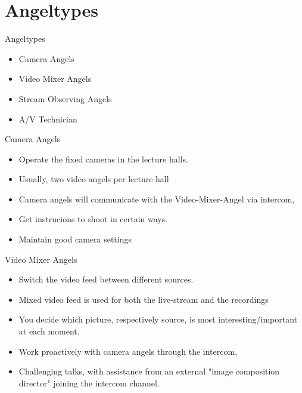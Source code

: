 \documentclass[aspectratio=169]{beamer}
\begin{document}
\section{Angeltypes}
\begin{frame}{Angeltypes}
	\begin{itemize}
		\item Camera Angels
		\item Video Mixer Angels
		\item Stream Observing Angels
		\item A/V Technician
	\end{itemize}
\end{frame}

\begin{frame}{Camera Angels}
	\begin{itemize}
		\item Operate the fixed cameras in the lecture halls. 
		\item Usually, two video angels per lecture hall 
		\item Camera angels will communicate with the Video-Mixer-Angel via intercom,
		\item Get instrucions to shoot in certain ways. 
		\item Maintain good camera settings 
	\end{itemize}
\end{frame}

\begin{frame}{Video Mixer Angels}
	\begin{itemize}
		\item Switch the video feed between different sources. 
		\item Mixed video feed is used for both the live-stream and the recordings 
		\item You decide which picture, respectively source, is most interesting/important at each moment.
		\item Work proactively with camera angels through the intercom, 
		\item Challenging talks, with assistance from an external "image composition director" joining the intercom channel.
	\end{itemize}
\end{frame}
\end{document}
